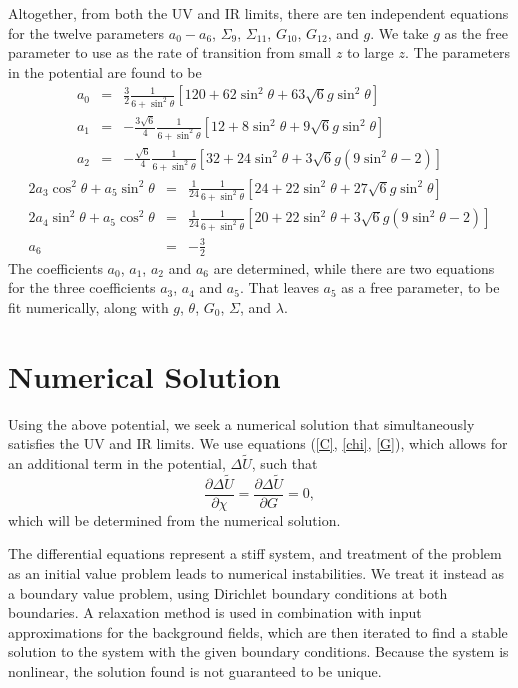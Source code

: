 \documentclass[12pt]{article}
\newcommand{\be}{\begin{equation}}
\newcommand{\ee}{\end{equation}}
\newcommand{\ba}{\begin{eqnarray}}
\newcommand{\ea}{\end{eqnarray}}
\def\rt6{\sqrt{6}}
\begin{document}
Altogether, from both the UV and IR limits, there are ten independent equations for the twelve parameters $a_0 - a_6$, $\Sigma_9$, $\Sigma_{11}$, $G_{10}$, $G_{12}$, and $g$.  
We take $g$ as the free parameter to use as the rate of transition from small $z$ to large $z$.  
The parameters in the potential are found to be
\ba
a_0 &=&  \frac{3}{2} \frac{1}{6 + \sin^2 \theta}\left[ 120 + 62 \sin^2 \theta + 63 \rt6 g \sin^2 \theta \right] \\
a_1 &=&  -\frac{3\rt6}{4} \frac{1}{6 + \sin^2 \theta}\left[ 12 + 8 \sin^2 \theta + 9 \rt6 g \sin^2 \theta \right] \\
a_2 &=&  -\frac{\rt6}{4} \frac{1}{6 + \sin^2 \theta}\left[ 32 + 24 \sin^2 \theta + 3 \rt6 g(9 \sin^2 \theta - 2) \right]
\ea
\ba
2 a_3 \cos^2 \theta + a_5 \sin^2 \theta&=&\frac{1}{24} \frac{1}{6 + \sin^2 \theta}\left[ 24 + 22 \sin^2 \theta + 27 \rt6 g \sin^2 \theta \right] \\
2 a_4 \sin^2 \theta + a_5 \cos^2 \theta&=&\frac{1}{24} \frac{1}{6 + \sin^2 \theta}\left[ 20 +22 \sin^2 \theta + 3 \rt6 g (9 \sin^2 \theta -2 ) \right]\\
a_6&=&-\frac{3}{2}
\ea
The coefficients $a_0$, $a_1$, $a_2$ and $a_6$ are determined, while there are two equations for the three coefficients $a_3$, $a_4$ and $a_5$.  
That leaves $a_5$ as a free parameter, to be fit numerically, along with $g$, $\theta$, $G_0$, $\Sigma$, and $\lambda$.

\section{Numerical Solution}

Using the above potential, we seek a numerical solution that simultaneously satisfies the UV and IR limits. 
We use equations (\ref{C}, \ref{chi}, \ref{G}), which allows for an additional term in the potential, $\Delta \tilde{U}$, such that 
\be
\frac{\partial \Delta \tilde{U}}{\partial \chi} = \frac{\partial \Delta \tilde{U}}{\partial G} = 0,
\ee
which will be determined from the numerical solution.

The differential equations represent a stiff system, and treatment of the problem as an initial value problem leads to numerical instabilities. 
We treat it instead as a boundary value problem, using Dirichlet boundary conditions at both boundaries. 
A relaxation method is used in combination with input approximations for the background fields, which are then iterated to find a stable solution to the system with the given boundary conditions. 
Because the system is nonlinear, the solution found is not guaranteed to be unique.
\end{document}
